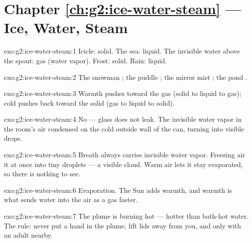 \section*{Chapter \ref{ch:g2:ice-water-steam} --- Ice, Water, Steam}

\begin{solution}{exo:g2:ice-water-steam:1}
Icicle: solid. The sea: liquid. The invisible water above the spout:
gas (water vapor). Frost: solid. Rain: liquid.
\end{solution}

\begin{solution}{exo:g2:ice-water-steam:2}
The snowman ; the puddle ; the mirror mist ;
the pond .
\end{solution}

\begin{solution}{exo:g2:ice-water-steam:3}
Warmth pushes toward the gas (solid to liquid to gas); cold pushes
back toward the solid (gas to liquid to solid).
\end{solution}

\begin{solution}{exo:g2:ice-water-steam:4}
No --- glass does not leak. The invisible water vapor in the room's
air condensed on the cold outside wall of the can, turning into
visible drops.
\end{solution}

\begin{solution}{exo:g2:ice-water-steam:5}
Breath always carries invisible water vapor. Freezing air 
it at once into tiny droplets --- a visible cloud. Warm air lets it
stay evaporated, so there is nothing to see.
\end{solution}

\begin{solution}{exo:g2:ice-water-steam:6}
Evaporation. The Sun adds warmth, and warmth is what sends water
into the air as a gas faster.
\end{solution}

\begin{solution}{exo:g2:ice-water-steam:7}
The plume is burning hot --- hotter than bath-hot water. The rule:
never put a hand in the plume, lift lids away from you, and only
with an adult nearby.
\end{solution}

